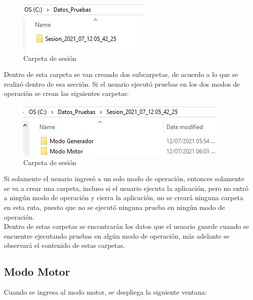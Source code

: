 \documentclass[12pt,titlepage]{article}
\begin{document}
\begin{figure}[htbp]
\hspace*{5.8cm} 
\includegraphics[scale=0.78]{Carpeta}
\caption{Carpeta de sesión}
\end{figure}

Dentro de esta carpeta se van creando dos subcarpetas, de acuerdo a lo que se realizó dentro de esa sección. Si el usuario ejecutó pruebas en los dos modos de operación se crean las siguientes carpetas: \\
\begin{figure}[htbp]
\hspace*{4.8cm} 
\includegraphics[scale=0.78]{Carpetas}
\caption{Carpeta de sesión}
\end{figure}

Si solamente el usuario  ingresó a un solo modo de operación, entonces solamente se va a crear una carpeta, incluso si el usuario ejecuta la aplicación, pero no entró a ningún modo de operación y cierra la aplicación, no se creará ninguna carpeta en esta ruta, puesto que no se ejecutó ninguna prueba en ningún modo de operación. \\ 

Dentro de estas carpetas se encontrarán los datos que el usuario guarde cuando se encuentre ejecutando  pruebas en algún modo de operación, más adelante se observará el contenido de estas carpetas. \\
\newpage
\subsection{Modo Motor}
Cuando se ingresa al modo motor, se despliega la siguiente ventana: \\ 
\end{document}
